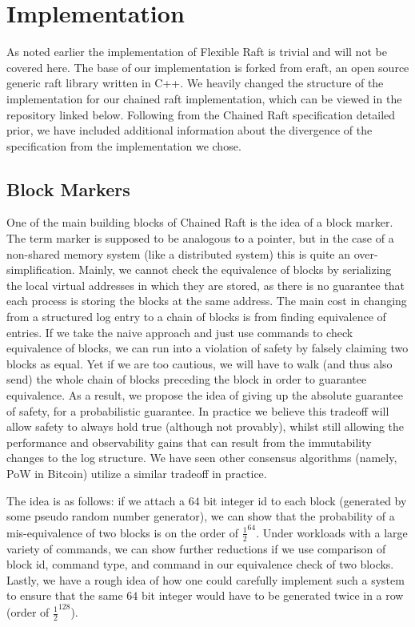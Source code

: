 \section{Implementation}
\label{sec:implementation}
As noted earlier the implementation of Flexible Raft is trivial and will not be covered here. 
The base of our implementation is forked from eraft, an open source generic raft library written in C++. 
We heavily changed the structure of the implementation for our chained raft implementation, which can be viewed in the repository linked below. 
Following from the Chained Raft specification detailed prior, we have included additional information about the divergence of the specification from the implementation we chose.

\subsection{Block Markers}
    One of the main building blocks of Chained Raft is the idea of a block marker. 
The term marker is supposed to be analogous to a pointer, but in the case of a non-shared memory system (like a distributed system) this is quite an over-simplification. 
Mainly, we cannot check the equivalence of blocks by serializing the local virtual addresses in which they are stored, as there is no guarantee that each process is storing the blocks at the same address.
    The main cost in changing from a structured log entry to a chain of blocks is from finding equivalence of entries. 
    If we take the naive approach and just use commands to check equivalence of blocks, we can run into a violation of safety by falsely claiming two blocks as equal. 
    Yet if we are too cautious, we will have to walk (and thus also send) the whole chain of blocks preceding the block in order to guarantee equivalence. 
        As a result, we propose the idea of giving up the absolute guarantee of safety, for a probabilistic guarantee. 
        In practice we believe this tradeoff will allow safety to always hold true (although not provably), whilst still allowing the performance and observability gains that can result from the immutability changes to the log structure. 
        We have seen other consensus algorithms (namely, PoW in Bitcoin\cite{nakamoto2012bitcoin}) utilize a similar tradeoff in practice.
  
The idea is as follows: if we attach a $64$ bit integer id to each block (generated by some pseudo random number generator), we can show that the probability of a mis-equivalence of two blocks is on the order of $\frac{1}{2}^{64}$. 
Under workloads with a large variety of commands, we can show further reductions if we use comparison of block id, command type, and command in our equivalence check of two blocks. 
Lastly, we have a rough idea of how one could carefully implement such a system to ensure that the same $64$ bit integer would have to be generated twice in a row (order of $\frac{1}{2}^{128}$).
    
